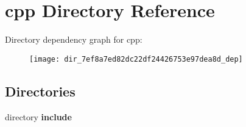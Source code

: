 \section{cpp Directory Reference}
\label{dir_7ef8a7ed82dc22df24426753e97dea8d}
Directory dependency graph for cpp\-:
\nopagebreak
\begin{figure}[H]
\begin{center}
\leavevmode
\texttt{[image: dir\_7ef8a7ed82dc22df24426753e97dea8d\_dep]}
\end{center}
\end{figure}
\subsection*{Directories}
\begin{DoxyCompactItemize}
\item 
directory {\bf include}
\end{DoxyCompactItemize}
